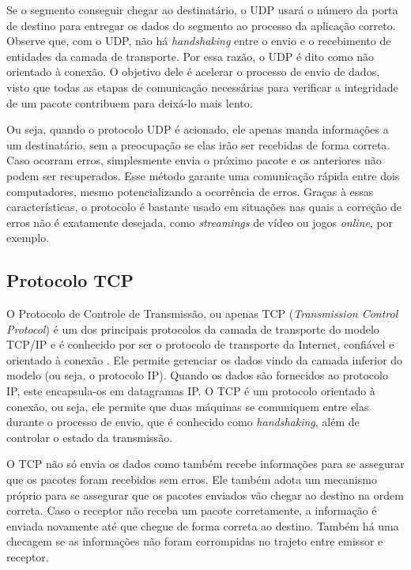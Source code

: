\documentclass[12pt]{article}
\begin{document}
Se o segmento conseguir chegar ao destinatário, o UDP usará o número da porta de destino para entregar os dados do segmento ao processo da aplicação correto. Observe que, com o UDP, não há \textit{handshaking} entre o envio e o recebimento de entidades da camada de transporte. Por essa razão, o UDP é dito como não orientado à conexão. O objetivo dele é acelerar o processo de envio de dados, visto que todas as etapas de comunicação necessárias para verificar a integridade de um pacote contribuem para deixá-lo mais lento.

Ou seja, quando o protocolo UDP é acionado, ele apenas manda informações a um destinatário, sem a preocupação se elas irão ser recebidas de forma correta. Caso ocorram erros, simplesmente envia o próximo pacote e os anteriores não podem ser recuperados. Esse método garante uma comunicação rápida entre dois computadores, mesmo potencializando a ocorrência de erros. Graças à essas características, o protocolo é bastante usado em situações nas quais a correção de erros não é exatamente desejada, como \textit{streamings} de vídeo ou jogos \textit{online}, por exemplo. 


\subsection{Protocolo TCP}

O Protocolo de Controle de Transmissão, ou apenas TCP (\textit{Transmission Control Protocol}) é um dos principais protocolos da camada de transporte do modelo TCP/IP e é conhecido por ser o protocolo de transporte da Internet, confiável e orientado à conexão \cite{kurose2013computer}. Ele permite gerenciar os dados vindo da camada inferior do modelo (ou seja, o protocolo IP). Quando os dados são fornecidos ao protocolo IP, este encapsula-os em datagramas IP. O TCP é um protocolo orientado à conexão, ou seja, ele permite que duas máquinas se comuniquem entre elas durante o processo de envio, que é conhecido como \textit{handshaking}, além de controlar o estado da transmissão.

O TCP não só envia os dados como também recebe informações para se assegurar que os pacotes foram recebidos sem erros. Ele também adota um mecanismo próprio para se assegurar que os pacotes enviados vão chegar ao destino na ordem correta. Caso o receptor não receba um pacote corretamente, a informação é enviada novamente até que chegue de forma correta ao destino. Também há uma checagem se as informações não foram corrompidas no trajeto entre emissor e receptor.
\end{document}
